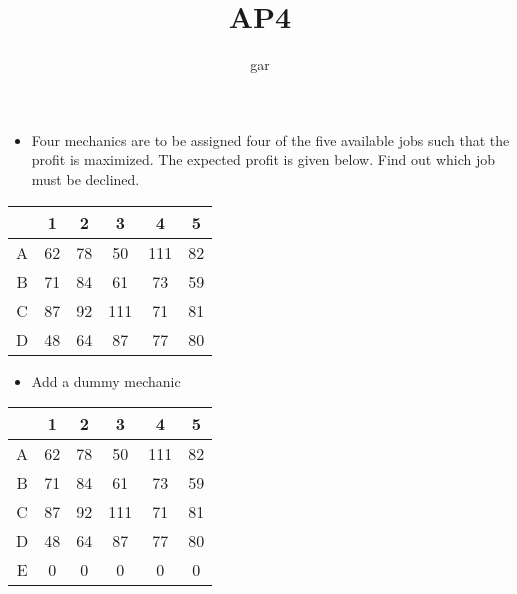 \documentclass[12pt]{beamer}
\title{AP4}
\author{gar}
\date{}
\begin{document}
\maketitle

\begin{frame}
\begin{itemize}
\item Four mechanics are to be assigned four of the five available jobs such that the profit is maximized. 
The expected profit is given below. Find out which job must be declined.
\end{itemize}
\begin{center}
\begin{tabular}{|c|ccccc|}
\hline
  & 1  & 2  & 3   & 4   & 5  \\
\hline
A & 62 & 78 & 50  & 111 & 82 \\
B & 71 & 84 & 61  & 73  & 59 \\
C & 87 & 92 & 111 & 71  & 81 \\
D & 48 & 64 & 87  & 77  & 80 \\
\hline
\end{tabular}
\end{center}
\end{frame}

\begin{frame}
\begin{itemize}
\item Add a dummy mechanic
\end{itemize}
\begin{center}
\begin{tabular}{|c|ccccc|}
\hline
  & 1  & 2  & 3   & 4   & 5  \\
\hline
A & 62 & 78 & 50  & 111 & 82 \\
B & 71 & 84 & 61  & 73  & 59 \\
C & 87 & 92 & 111 & 71  & 81 \\
D & 48 & 64 & 87  & 77  & 80 \\
E & 0  & 0  & 0   & 0   & 0  \\
\hline
\end{tabular}
\end{center}
\end{frame}
\end{document}
